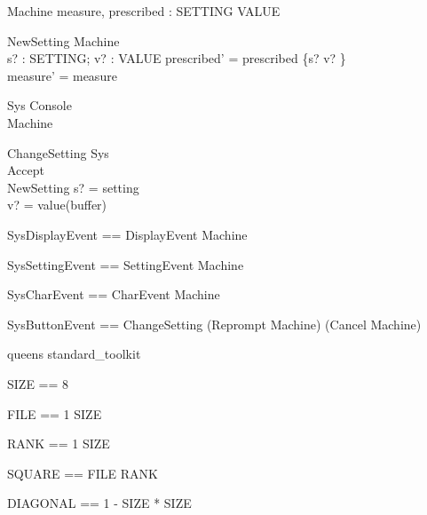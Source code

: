 \documentclass{llncs}
\begin{document}
\begin{schema}{Machine}
measure, prescribed : SETTING \fun VALUE
\end{schema}
\begin{schema}{NewSetting}
\Delta Machine \\
s? : SETTING; v? : VALUE 
\where prescribed' = prescribed \oplus \{s? \mapsto v? \}\\
measure' = measure 
\end{schema}
\begin{schema}{Sys}
Console \\
Machine
\end{schema}
\begin{schema}{ChangeSetting}
\Delta Sys \\
Accept \\
NewSetting
\where s? = setting \\
v? = value(buffer)
\end{schema}
\begin{zed}
SysDisplayEvent == DisplayEvent \land \Xi Machine
\end{zed}
\begin{zed}
SysSettingEvent == SettingEvent \land \Xi Machine
\end{zed}
\begin{zed}
SysCharEvent == CharEvent \land \Xi Machine
\end{zed}
\begin{zed}
SysButtonEvent == ChangeSetting \lor (Reprompt \land \Xi
Machine) \lor (Cancel \land \Xi Machine)
\end{zed}



\begin{zsection}
\SECTION queens \parents standard\_toolkit
\end{zsection}

\begin{zed}
SIZE == 8
\end{zed}

\begin{zed}
FILE == 1 \upto SIZE
\end{zed}

\begin{zed}
RANK == 1 \upto SIZE
\end{zed}

\begin{zed}
SQUARE == FILE \cross RANK
\end{zed}

\begin{zed}
DIAGONAL == 1 - SIZE  * SIZE
\end{zed}
\end{document}
